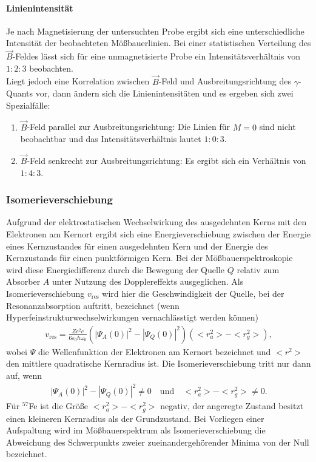 \documentclass[a4paper,twoside,final]{article}
\begin{document}
\paragraph{Linienintensität} Je nach Magnetisierung der untersuchten Probe ergibt sich eine unterschiedliche Intensität der beobachteten Mößbauerlinien. Bei einer statistischen Verteilung des $\vec{B}$-Feldes lässt sich für eine unmagnetisierte Probe ein Intensitätsverhältnis von $1:2:3$ beobachten.\\
Liegt jedoch eine Korrelation zwischen $\vec{B}$-Feld und Ausbreitungsrichtung des $\gamma$-Quants vor, dann ändern sich die Linienintensitäten und es ergeben sich zwei Spezialfälle:
\begin{enumerate}
  \item $\vec{B}$-Feld parallel zur Ausbreitungsrichtung: Die Linien für $M=0$ sind nicht beobachtbar und das Intensitätsverhältnis lautet $1:0:3$.
  \item $\vec{B}$-Feld senkrecht zur Ausbreitungsrichtung: Es ergibt sich ein Verhältnis von $1:4:3$.
\end{enumerate}

\subsubsection{Isomerieverschiebung}
Aufgrund der elektrostatischen Wechselwirkung des ausgedehnten Kerns mit den Elektronen am Kernort ergibt sich eine Energieverschiebung zwischen der Energie eines Kernzustandes für einen ausgedehnten Kern und der Energie des Kernzustands für einen punktförmigen Kern.
Bei der Mößbauerspektroskopie wird diese Energiedifferenz durch die Bewegung der Quelle $Q$ relativ zum Absorber $A$ unter Nutzung des Dopplereffekts ausgeglichen. Als Isomerieverschiebung $v_\text{res}$ wird hier die Geschwindigkeit der Quelle, bei der Resonanzabsorption auftritt, bezeichnet (wenn Hyperfeinstrukturwechselwirkungen vernachlässtigt werden können)
\begin{align}
  v_\text{res} = \frac{Z e^2 c}{6\varepsilon_0 \hbar \omega_0}(|\Psi_A(0)|^2-|\Psi_Q(0)|^2)(<r_a^2>-<r_g^2>),
\end{align}
wobei $\Psi$ die Wellenfunktion der Elektronen am Kernort bezeichnet und $<r^2>$ den mittlere quadratische Kernradius ist.
Die Isomerieverschiebung tritt nur dann auf, wenn
\begin{align}
  |\Psi_A(0)|^2-|\Psi_Q(0)|^2 \neq 0 \quad \text{und} \quad <r_a^2>-<r_g^2> \neq 0.
\end{align}
Für $^{57}$Fe ist die Größe $<r_a^2>-<r_g^2>$ negativ, der angeregte Zustand besitzt einen kleineren Kernradius als der Grundzustand.
Bei Vorliegen einer Aufspaltung wird im Mößbauerspektrum als Isomerieverschiebung die Abweichung des Schwerpunkts zweier zueinandergehörender Minima von der Null bezeichnet.
\end{document}
